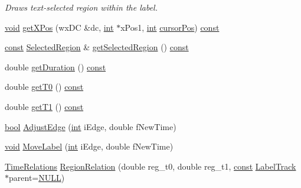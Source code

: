 \begin{DoxyCompactItemize}
\begin{DoxyCompactList}\small\item\em Draws text-\/selected region within the label. \end{DoxyCompactList}\item 
\hyperlink{sound_8c_ae35f5844602719cf66324f4de2a658b3}{void} \hyperlink{class_label_struct_ab3574594fda59c1bdd6512f83c440546}{get\+X\+Pos} (wx\+DC \&dc, \hyperlink{xmltok_8h_a5a0d4a5641ce434f1d23533f2b2e6653}{int} $\ast$x\+Pos1, \hyperlink{xmltok_8h_a5a0d4a5641ce434f1d23533f2b2e6653}{int} \hyperlink{winguistuff_8c_ac7cbd20570eca17e4a8ce0c468f7506b}{cursor\+Pos}) \hyperlink{getopt1_8c_a2c212835823e3c54a8ab6d95c652660e}{const} 
\item 
\hyperlink{getopt1_8c_a2c212835823e3c54a8ab6d95c652660e}{const} \hyperlink{class_selected_region}{Selected\+Region} \& \hyperlink{class_label_struct_ab303be8751a5193c029de72c1272768c}{get\+Selected\+Region} () \hyperlink{getopt1_8c_a2c212835823e3c54a8ab6d95c652660e}{const} 
\item 
double \hyperlink{class_label_struct_a5cc62c5ebc5575b5684e5ca9cab852c9}{get\+Duration} () \hyperlink{getopt1_8c_a2c212835823e3c54a8ab6d95c652660e}{const} 
\item 
double \hyperlink{class_label_struct_a5b45743875b4220d8173e34bf9b0f54b}{get\+T0} () \hyperlink{getopt1_8c_a2c212835823e3c54a8ab6d95c652660e}{const} 
\item 
double \hyperlink{class_label_struct_ac5df1836d89b3356da7300f89fc2ed69}{get\+T1} () \hyperlink{getopt1_8c_a2c212835823e3c54a8ab6d95c652660e}{const} 
\item 
\hyperlink{mac_2config_2i386_2lib-src_2libsoxr_2soxr-config_8h_abb452686968e48b67397da5f97445f5b}{bool} \hyperlink{class_label_struct_ad88079eee444025012070a1f831fbf23}{Adjust\+Edge} (\hyperlink{xmltok_8h_a5a0d4a5641ce434f1d23533f2b2e6653}{int} i\+Edge, double f\+New\+Time)
\item 
\hyperlink{sound_8c_ae35f5844602719cf66324f4de2a658b3}{void} \hyperlink{class_label_struct_a1405e19e8ecc7dbb9b36e279481c3a15}{Move\+Label} (\hyperlink{xmltok_8h_a5a0d4a5641ce434f1d23533f2b2e6653}{int} i\+Edge, double f\+New\+Time)
\item 
\hyperlink{class_label_struct_a3e70ad31acce8270b0796c9e46bbdfe8}{Time\+Relations} \hyperlink{class_label_struct_a5e751529e48aabccb0d46492217099f4}{Region\+Relation} (double reg\+\_\+t0, double reg\+\_\+t1, \hyperlink{getopt1_8c_a2c212835823e3c54a8ab6d95c652660e}{const} \hyperlink{class_label_track}{Label\+Track} $\ast$parent=\hyperlink{px__mixer_8h_a070d2ce7b6bb7e5c05602aa8c308d0c4}{N\+U\+LL})
\end{DoxyCompactItemize}
